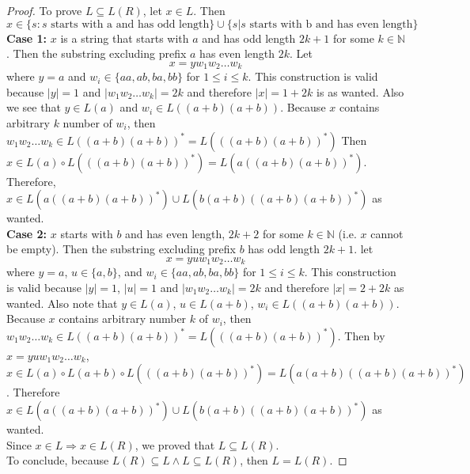 \documentclass[11pt]{article}
\theoremstyle{plain}%
\theoremstyle{definition}
\theoremstyle{remark}
\newcommand{\N}{\mathbb{N}}
\begin{document}
\begin{enumerate}
\begin{proof}
  To prove $L\subseteq L(R)$, let $x\in L$. Then
  \[
    x\in \{s: s \text{ starts with a and has odd length}\}\cup \{s|s \text{ starts with b and has even length} \}
  \]
  \textbf{Case 1:} $x$ is a string that starts with $a$ and has odd length $2k+1$ for some $k\in\N$. Then the substring excluding prefix $a$ has even length $2k$. Let
  \[
    x=yw_1w_2 \dots w_k
  \]
  where $y=a$ and $w_i \in \{aa, ab, ba, bb\}$ for $1\leq i\leq k$. This construction is valid because $|y|=1$ and $| w_1w_2\dots w_k | = 2k$ and therefore $|x| = 1 + 2k$ is as wanted. Also we see that $y\in L(a)$ and $w_i\in L((a+b)(a+b))$. Because $x$ contains arbitrary $k$ number of $w_i$, then $w_1w_2 \dots w_k \in L((a+b)(a+b))^* = L(((a+b)(a+b))^*)$ Then $x \in L(a)\circ L(((a+b)(a+b))^*) = L(a((a+b)(a+b))^*)$. Therefore, $x\in L(a((a+b)(a+b))^*) \cup L(b(a+b)((a+b)(a+b))^*)$ as wanted.\\
  \textbf{Case 2:} $x$ starts with $b$ and has even length, $2k+2$ for some $k\in\N$ (i.e. $x$ cannot be empty). Then the substring excluding prefix $b$ has odd length $2k+1$. let
  \[
    x=yuw_1w_2 \dots w_k
  \]
  where $y=a$, $u\in\{ a,b\}$, and $w_i\in \{ aa,ab,ba, bb\}$ for $1\leq i \leq k$. This construction is valid because $|y|=1$, $|u|=1$ and $|w_1w_2 \dots w_k| = 2k$ and therefore $|x| = 2+2k$ as wanted. Also note that $y\in L(a)$, $u\in L(a+b)$, $w_i \in L((a+b)(a+b))$. Because $x$ contains arbitrary number $k$ of $w_i$, then $w_1w_2 \dots w_k\in L((a+b)(a+b))^* = L(((a+b)(a+b))^*)$. Then by $x=yuw_1w_2 \dots w_k$, $x\in L(a)\circ L(a+b) \circ L(((a+b)(a+b))^*) = L(a(a+b)((a+b)(a+b))^*)$. Therefore $x\in L(a((a+b)(a+b))^*) \cup L(b(a+b)((a+b)(a+b))^*)$ as wanted. \\

  Since $x\in L \Rightarrow x\in L(R)$, we proved that $L\subseteq L(R)$.\\

  To conclude, because $L(R)\subseteq L \land L\subseteq L(R)$, then $L = L(R)$.

\end{proof}
\end{enumerate}
\end{document}
